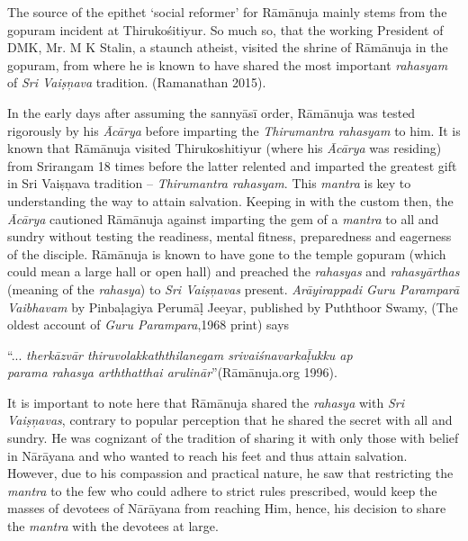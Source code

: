 The source of the epithet ‘social reformer’ for Rāmānuja mainly stems from the gopuram incident at Thirukośitiyur. So much so, that the working President of DMK, Mr. M K Stalin, a staunch atheist, visited the shrine of Rāmānuja in the gopuram, from where he is known to have shared the most important \textit{rahasyam} of \textit{Sri Vaiṣņava} tradition. (Ramanathan 2015).

In the early days after assuming the sannyāsī order, Rāmānuja was tested rigorously by his \textit{Ācārya} before imparting the \textit{Thirumantra rahasyam} to him. It is known that Rāmānuja visited Thirukoshitiyur (where his \textit{Ācārya} was residing) from Srirangam 18 times before the latter relented and imparted the greatest gift in Sri Vaiṣņava tradition – \textit{Thirumantra rahasyam}. This \textit{mantra} is key to understanding the way to attain salvation. Keeping in with the custom then, the \textit{Ācārya} cautioned Rāmānuja against imparting the gem of a \textit{mantra} to all and sundry without testing the readiness, mental fitness, preparedness and eagerness of the disciple. Rāmānuja is known to have gone to the temple gopuram (which could mean a large hall or open hall) and preached the \textit{rahasyas} and \textit{rahasyārthas} (meaning of the \textit{rahasya}) to \textit{Sri Vaiṣņavas }present. \textit{Arāyirappadi Guru Paramparā Vaibhavam} by Pinbaḷagiya Perumāḷ Jeeyar, published by Puththoor Swamy, (The oldest account of \textit{Guru Parampara},1968 print) says

\begin{myquote}
“... \textit{therkāzvār thiruvolakkaththilanegam srivaiśnavarkaḹukku ap}\\\textit{parama rahasya arththatthai arulinār}”(Rāmānuja.org 1996).
\end{myquote}

It is important to note here that Rāmānuja shared the \textit{rahasya} with \textit{Sri Vaiṣņavas}, contrary to popular perception that he shared the secret with all and sundry. He was cognizant of the tradition of sharing it with only those with belief in Nārāyana and who wanted to reach his feet and thus attain salvation. However, due to his compassion and practical nature, he saw that restricting the \textit{mantra} to the few who could adhere to strict rules prescribed, would keep the masses of devotees of Nārāyana from reaching Him, hence, his decision to share the \textit{mantra }with the devotees at large.


